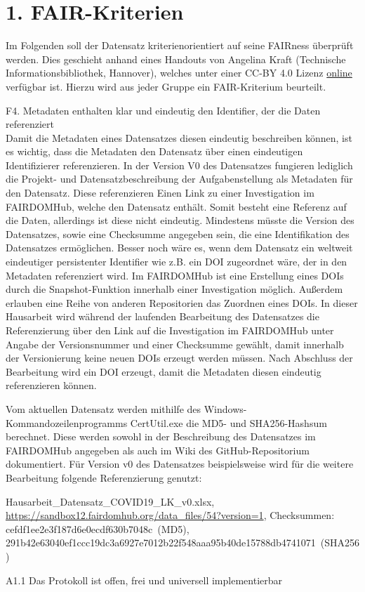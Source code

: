 \documentclass[12pt,a4paper,toc=bibliographynumbered,toc=indenttextentries]{scrreprt}
\begin{document}
		\section*{1. FAIR-Kriterien}
		Im Folgenden soll der Datensatz kriterienorientiert auf seine FAIRness überprüft werden. Dies geschieht anhand eines Handouts von Angelina Kraft (Technische Informationsbibliothek, Hannover), welches unter einer CC-BY 4.0 Lizenz \href{https://blogs.tib.eu/wp/tib/wp-content/uploads/sites/3/2017/09/Die-FAIR-Data-Prinzipien.pdf}{online} verfügbar ist. Hierzu wird aus jeder Gruppe ein FAIR-Kriterium beurteilt.\par
		\begin{description}
			\item F4. Metadaten enthalten klar und eindeutig den Identifier, der die Daten referenziert \\
			
			Damit die Metadaten eines Datensatzes diesen eindeutig beschreiben können, ist es wichtig, dass die Metadaten den Datensatz über einen eindeutigen Identifizierer referenzieren. In der Version V0 des Datensatzes fungieren lediglich die Projekt- und Datensatzbeschreibung der Aufgabenstellung als Metadaten für den Datensatz. Diese referenzieren Einen Link zu einer Investigation im FAIRDOMHub, welche den Datensatz enthält. Somit besteht eine Referenz auf die Daten, allerdings ist diese nicht eindeutig. Mindestens müsste die Version des Datensatzes, sowie eine Checksumme angegeben sein, die eine Identifikation des Datensatzes ermöglichen. Besser noch wäre es, wenn dem Datensatz ein weltweit eindeutiger persistenter Identifier wie z.B. ein DOI zugeordnet wäre, der in den Metadaten referenziert wird.
			Im FAIRDOMHub ist eine Erstellung eines DOIs durch die Snapshot-Funktion innerhalb einer Investigation möglich. Außerdem erlauben eine Reihe von anderen Repositorien das Zuordnen eines DOIs. In dieser Hausarbeit wird während der laufenden Bearbeitung des Datensatzes die Referenzierung über den Link auf die Investigation im FAIRDOMHub unter Angabe der Versionsnummer und einer Checksumme gewählt, damit innerhalb der Versionierung keine neuen DOIs erzeugt werden müssen. Nach Abschluss der Bearbeitung wird ein DOI erzeugt, damit die Metadaten diesen eindeutig referenzieren können.\par
			Vom aktuellen Datensatz werden mithilfe des Windows-Kommandozeilenprogramms CertUtil.exe die MD5- und SHA256-Hashsum berechnet. Diese werden sowohl in der Beschreibung des Datensatzes im FAIRDOMHub angegeben als auch im Wiki des GitHub-Repositorium dokumentiert.
			Für Version v0 des Datensatzes beispielsweise wird für die weitere Bearbeitung folgende Referenzierung genutzt:\par
			\textsf{Hausarbeit\_Datensatz\_COVID19\_LK\_v0.xlsx,  \url{https://sandbox12.fairdomhub.org/data_files/54?version=1}, Checksummen: cefdf1ee2e3f187d6e0ecdf630b7048c~(MD5), 291b42e63040ef1ccc19dc3a6927e7012b22f548aaa95b40de15788db4741071~(SHA256)}  
			\item A1.1 Das Protokoll ist offen, frei und universell implementierbar \\
			

\end{description}
\end{document}
